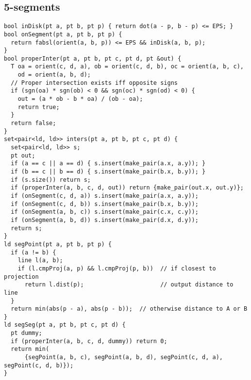 \documentclass[twoside]{article}
\begin{document}
\begin{multicols*}{2}
{\subsection*{5-segments}
}
\begin{verbatim}
bool inDisk(pt a, pt b, pt p) { return dot(a - p, b - p) <= EPS; }
bool onSegment(pt a, pt b, pt p) {
  return fabsl(orient(a, b, p)) <= EPS && inDisk(a, b, p);
}
bool properInter(pt a, pt b, pt c, pt d, pt &out) {
  T oa = orient(c, d, a), ob = orient(c, d, b), oc = orient(a, b, c),
    od = orient(a, b, d);
  // Proper intersection exists iff opposite signs
  if (sgn(oa) * sgn(ob) < 0 && sgn(oc) * sgn(od) < 0) {
    out = (a * ob - b * oa) / (ob - oa);
    return true;
  }
  return false;
}
set<pair<ld, ld>> inters(pt a, pt b, pt c, pt d) {
  set<pair<ld, ld>> s;
  pt out;
  if (a == c || a == d) { s.insert(make_pair(a.x, a.y)); }
  if (b == c || b == d) { s.insert(make_pair(b.x, b.y)); }
  if (s.size()) return s;
  if (properInter(a, b, c, d, out)) return {make_pair(out.x, out.y)};
  if (onSegment(c, d, a)) s.insert(make_pair(a.x, a.y));
  if (onSegment(c, d, b)) s.insert(make_pair(b.x, b.y));
  if (onSegment(a, b, c)) s.insert(make_pair(c.x, c.y));
  if (onSegment(a, b, d)) s.insert(make_pair(d.x, d.y));
  return s;
}
ld segPoint(pt a, pt b, pt p) {
  if (a != b) {
    line l(a, b);
    if (l.cmpProj(a, p) && l.cmpProj(p, b))  // if closest to projection
      return l.dist(p);                      // output distance to line
  }
  return min(abs(p - a), abs(p - b));  // otherwise distance to A or B
}
ld segSeg(pt a, pt b, pt c, pt d) {
  pt dummy;
  if (properInter(a, b, c, d, dummy)) return 0;
  return min(
      {segPoint(a, b, c), segPoint(a, b, d), segPoint(c, d, a), segPoint(c, d, b)});
}

\end{verbatim}

{
}
\end{multicols*}
\end{document}
